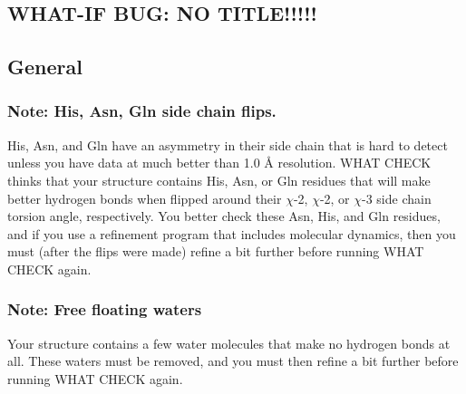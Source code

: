 \documentclass[a4paper]{article}
\def\showsect#1{
  \thesect\gdef\thesect{}
  \thessect\gdef\thessect{}
  \subsubsection{#1}
}
\gdef\thesect{\pagebreak[2]\section{WHAT-IF BUG: NO TITLE!!!!!}}
\gdef\thessect{\subsection{General}}
\begin{document}
\begin{note}
\showsect{Note: His, Asn, Gln side chain flips.}
His, Asn, and Gln have an asymmetry in their side chain that is hard to
detect unless you have data at much better than 1.0 {\AA} resolution.
WHAT CHECK thinks that your structure contains His, Asn, or Gln residues that
will make better hydrogen bonds when flipped around their $\chi$-2, $\chi$-2, or
$\chi$-3 side chain torsion angle, respectively. You better
check these Asn, His, and Gln residues, and if you use a refinement program
that includes molecular dynamics, then you must (after the
flips were made) refine a bit further before running WHAT CHECK again.
\end{note}

\begin{note}
\showsect{Note: Free floating waters}
Your structure contains a few water molecules that make no hydrogen bonds at
all. These waters must be removed, and you must then refine a bit further
before running WHAT CHECK again.
\end{note}
\end{document}
